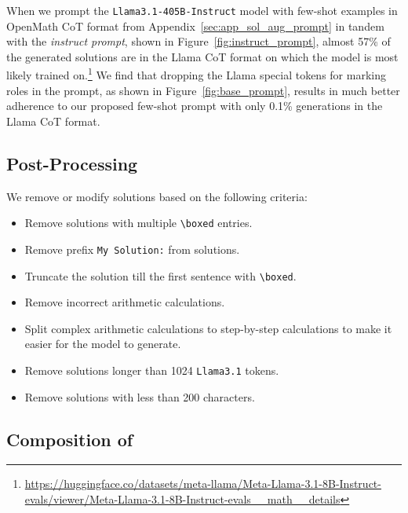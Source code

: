When we prompt the \texttt{Llama3.1-405B-Instruct} model with few-shot examples in OpenMath CoT format from Appendix~\ref{sec:app_sol_aug_prompt} in tandem with the \emph{instruct prompt}, shown in Figure~\ref{fig:instruct_prompt}, almost 57\% of the generated solutions are in the Llama CoT format on which the model is most likely trained on.\footnote{\url{https://huggingface.co/datasets/meta-llama/Meta-Llama-3.1-8B-Instruct-evals/viewer/Meta-Llama-3.1-8B-Instruct-evals__math__details}}  
We find that dropping the Llama special tokens for marking roles in the prompt, as shown in Figure~\ref{fig:base_prompt}, results in much better adherence to our proposed few-shot prompt with only 0.1\% generations in the Llama CoT format. 














\subsection{Post-Processing}
We remove or modify solutions based on the following criteria:
\begin{itemize}
    \setlength{\itemsep}{0pt} %
    \item Remove solutions with multiple \texttt{\textbackslash boxed} entries.
    \item Remove prefix \texttt{My Solution:} from solutions.
    \item Truncate the solution till the first sentence with   \texttt{\textbackslash boxed}.
    \item Remove incorrect arithmetic calculations.
    \item Split complex arithmetic calculations to step-by-step calculations to make it easier for the model to generate.
    \item Remove solutions longer than 1024 \texttt{Llama3.1} tokens.
    \item Remove solutions with less than 200 characters. 
    
\end{itemize}



\subsection{Composition of \dataset}


